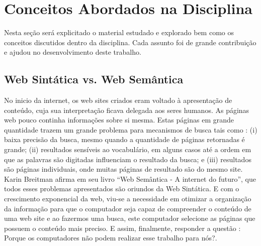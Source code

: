 \chapter{Conceitos Abordados na Disciplina}\label{cap5}

Nesta seção será explicitado o material estudado e explorado bem como os conceitos discutidos dentro da disciplina. Cada assunto foi de grande contribuição e ajudou no desenvolvimento deste trabalho.

\section{Web Sintática vs. Web Semântica}

No inicio da internet, os web sites criados eram voltado à apresentação de conteúdo, cuja sua interpretação ficava delegada aos seres humanos. As páginas web pouco continha informações sobre si mesma. Estas páginas em grande quantidade trazem um grande problema para mecanismos de busca tais como : (i) baixa precisão da busca, mesmo quando a quantidade de páginas retornadas é grande; (ii) resultados sensíveis ao vocabulário, em alguns casos até a ordem em que as palavras são digitadas influenciam o resultado da busca; e (iii) resultados são páginas individuais, onde muitas páginas de resultado são do mesmo site.  Karin Breitman afirma em seu livro “Web Semântica - A internet do futuro”, que todos esses problemas apresentados são oriundos da Web Sintática. E com o crescimento exponencial da web, viu-se a necessidade em otimizar a organização da informação para que o computador seja capaz de compreender o conteúdo de uma web site e ao fazermos uma busca, este computador selecione as páginas que possuem o conteúdo mais preciso. E assim, finalmente, responder a questão : Porque os computadores não podem realizar esse trabalho para nós?.


